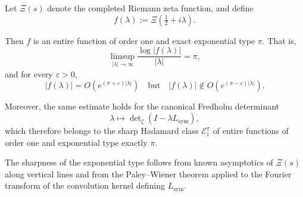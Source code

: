 \begin{lemma}
\label{lem:exact_type_pi}
Let \( \Xi(s) \) denote the completed Riemann zeta function, and define
\[
f(\lambda) := \Xi\left( \tfrac{1}{2} + i\lambda \right).
\]

Then \( f \) is an entire function of order one and exact exponential type \( \pi \). That is,
\[
\limsup_{|\lambda| \to \infty} \frac{\log |f(\lambda)|}{|\lambda|} = \pi,
\]
and for every \( \varepsilon > 0 \),
\[
|f(\lambda)| = O\left( e^{(\pi + \varepsilon)|\lambda|} \right)
\quad \text{but} \quad
|f(\lambda)| \notin O\left( e^{(\pi - \varepsilon)|\lambda|} \right).
\]

\medskip
\noindent
Moreover, the same estimate holds for the canonical Fredholm determinant
\[
\lambda \mapsto \det\nolimits_\zeta(I - \lambda L_{\mathrm{sym}}),
\]
which therefore belongs to the sharp Hadamard class \( \mathcal{E}_1^\pi \) of entire functions of order one and exponential type exactly \( \pi \).

\medskip
\noindent
The sharpness of the exponential type follows from known asymptotics of \( \Xi(s) \) along vertical lines and from the Paley–Wiener theorem applied to the Fourier transform of the convolution kernel defining \( L_{\mathrm{sym}} \).
\end{lemma}
% 